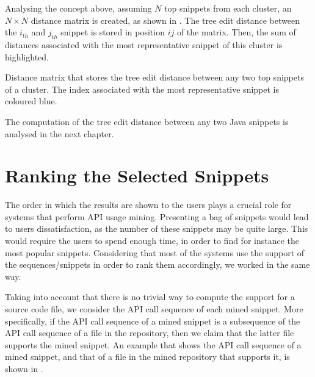 Analysing the concept above, assuming $N$ top snippets from each cluster, an $N\times N$ distance matrix is created, as shown in . The tree edit distance between the $i_{th}$ and $j_{th}$ snippet is stored in position $ij$ of the matrix. Then, the sum of distances associated with the most representative snippet of this cluster is highlighted.

\begin{table}[ht]
\centering
\small
\caption[Distance matrix computed using a tree edit distance metric]{Distance matrix that stores the tree edit distance between any two top snippets of a cluster. The index associated with the most representative snippet is coloured blue.}
\label{tables:apted-distance-matrix}

\end{table}

The computation of the tree edit distance between any two Java snippets is analysed in the next chapter.


\section{Ranking the Selected Snippets}
\label{sec:results-presentation}

The order in which the results are shown to the users plays a crucial role for systems that perform API usage mining. Presenting a bag of snippets would lead to users dissatisfaction, as the number of these snippets may be quite large. This would require the users to spend enough time, in order to find for instance the most popular snippets. Considering that most of the systems use the support of the sequences/snippets in order to rank them accordingly, we worked in the same way.

Taking into account that there is no trivial way to compute the support for a source code file, we consider the API call sequence of each mined snippet. More specifically, if the API call sequence of a mined snippet is a subsequence of the API call sequence of a file in the repository, then we claim that the latter file supports the mined snippet. An example that shows the API call sequence of a mined snippet, and that of a file in the mined repository that supports it, is shown in .

